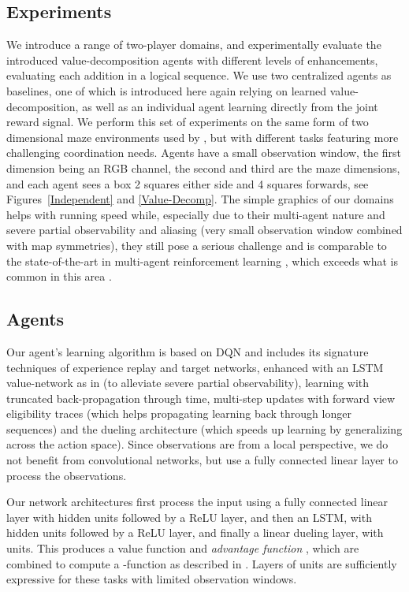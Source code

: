 \documentclass{article}
\begin{document}
\begin{SCfigure}
\section{Experiments} \label{ExperimentSection}
We introduce a range of two-player domains, and experimentally evaluate the introduced value-decomposition agents with different levels of enhancements, evaluating each addition in a logical sequence.  We use two centralized agents as baselines, one of which is introduced here again relying on learned value-decomposition, as well as an individual agent learning directly from the joint reward signal. We perform this set of experiments on the same form of two dimensional maze environments used by \citet{leibo2017}, but with different tasks featuring more challenging coordination needs. Agents have a small  observation window, the first dimension being an RGB channel, the second and third are the maze dimensions, and each agent sees a box 2 squares either side and 4 squares forwards, see Figures~\ref{Independent} and \ref{Value-Decomp}. The simple graphics of our domains helps with running speed while, especially due to their multi-agent nature and severe partial observability and aliasing (very small observation window combined with map symmetries), they still pose a serious challenge and is comparable to the state-of-the-art in multi-agent reinforcement learning \citep{leibo2017}, which exceeds what is common in this area \citep{TuylsW12}.

\subsection{Agents}
Our agent's learning algorithm is based on DQN \citep{dqn15} and includes its signature techniques of experience replay and target networks, enhanced with an LSTM value-network as in \citet{HausknechtStoneRecurrent} (to alleviate severe partial observability), learning with truncated back-propagation through time, multi-step updates with forward view eligibility traces \citep{HarbPrecupRecurrance} (which helps propagating learning back through longer sequences) and the dueling architecture \citep{WangDuelling} (which speeds up learning by generalizing across the action space). Since observations are from a local perspective, we do not benefit from convolutional networks, but use a fully connected linear layer to process the observations. 

Our network architectures first process the input using a fully connected linear layer with  hidden units followed by a ReLU layer, and then an LSTM, with  hidden units followed by a ReLU layer, and finally a linear dueling layer, with  units. This produces a value function  and \emph{advantage function} , which are combined to compute a -function  as described in \citet{WangDuelling}. Layers of  units are sufficiently expressive for these tasks with limited observation windows.


\end{SCfigure}
\end{document}
